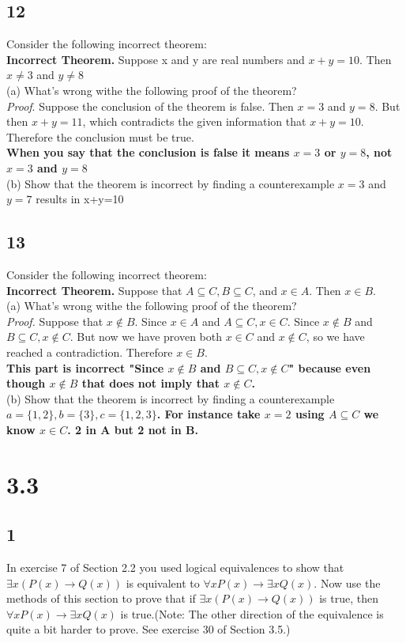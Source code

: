 \documentclass{article}
\begin{document}
\subsection{12}
Consider the following incorrect theorem:
\\
\textbf{Incorrect Theorem.} Suppose x and y are real numbers and $x+y=10$. Then $x \neq 3$ and $y \neq 8$
\\
(a) What's wrong withe the following proof of the theorem?
\\
\textit{Proof}. Suppose the conclusion of the theorem is false. Then $x = 3$ and $y = 8$. But then $x+y =11$, which contradicts the given information that $x+y=10$. Therefore the conclusion must be true.
\\
\textbf{When you say that the conclusion is false it means $x=3$ or $y=8$, not $x=3$ and $y=8$}
\\
(b) Show that the theorem is incorrect by finding a counterexample 
$x=3$ and $y=7$ results in x+y=10 
\newpage
\subsection{13}
 Consider the following incorrect theorem:
\\
\textbf{Incorrect Theorem.} Suppose that $A\subseteq C, B \subseteq C$, and $x \in A$. Then $x\in B$.
\\
(a) What's wrong withe the following proof of the theorem?
\\
\textit{Proof.} Suppose that $x \notin B $. Since  $x \in A$ and $A \subseteq C, x \in C$. Since $x \notin B$ and $B \subseteq C,x \notin C$. But now we have proven both $x \in C$ and $x \notin C$, so we have reached a contradiction. Therefore $x \in B$.
\\
\textbf{This part is incorrect "Since $x \notin B$ and $B \subseteq C,x \notin C$" because even though $x \notin B$ that does not imply that $x \notin C$.}
\\
(b) Show that the theorem is incorrect by finding a counterexample \\
\textbf{$a=\{1,2\}, b=\{3\} ,c=\{1,2,3\}$. For instance take $x=2$ using $A \subseteq C$ we know $x\in C$. 2 in A but 2 not in B.}
\section{3.3}
\subsection{1}
In exercise 7 of Section 2.2 you used logical equivalences to show that $\exists x(P(x)  \rightarrow Q(x))$ is equivalent to $\forall x P(x) \rightarrow \exists x   Q (x)$. Now use the methods of this section to prove that if $\exists x(P(x)\rightarrow Q(x))$ is true, then $\forall x P(x) \rightarrow \exists x Q(x)$ is true.(Note: The other direction of the equivalence is quite a bit harder to prove. See exercise 30 of Section 3.5.)
\end{document}
